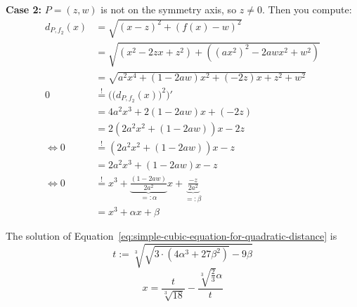 \documentclass[a4paper]{scrartcl}
\theoremstyle{break}
\theoremstyle{nonumberplain}
\begin{document}
\textbf{Case 2:} $P = (z, w)$ is not on the symmetry axis, so $z \neq 0$. Then you compute:
\begin{align}
  d_{P,{f_2}}(x)  &= \sqrt{(x-z)^2 + (f(x)-w)^2}\\
    &= \sqrt{(x^2 - 2zx + z^2) + ((ax^2)^2 - 2 awx^2 + w^2)}\\
    &= \sqrt{a^2x^4 + (1- 2 aw)x^2 +(- 2z)x + z^2 + w^2}\\
  0 &\stackrel{!}{=} \Big(\big(d_{P, {f_2}}(x)\big)^2\Big)' \\
    &= 4a^2x^3 + 2(1- 2 aw)x +(- 2z)\\
    &= 2 \left (2a^2x^2 + (1- 2 aw) \right )x - 2z\\
    \Leftrightarrow 0 &\stackrel{!}{=} (2a^2x^2  + (1- 2 aw)) x - z\\
    &= 2 a^2 x^3 + (1- 2 aw) x - z\\
\Leftrightarrow 0 &\stackrel{!}{=} x^3 + \underbrace{\frac{(1- 2 aw)}{2 a^2}}_{=: \alpha} x  + \underbrace{\frac{-z}{2 a^2}}_{=: \beta}\\
    &= x^3 + \alpha x + \beta\label{eq:simple-cubic-equation-for-quadratic-distance}
\end{align}

The solution of Equation~\ref{eq:simple-cubic-equation-for-quadratic-distance}
is
\[t := \sqrt[3]{\sqrt{3 \cdot (4 \alpha^3 + 27 \beta^2)} -9\beta}\]
\[x = \frac{t}{\sqrt[3]{18}} - \frac{\sqrt[3]{\frac{2}{3}} \alpha }{t}\]
\end{document}
